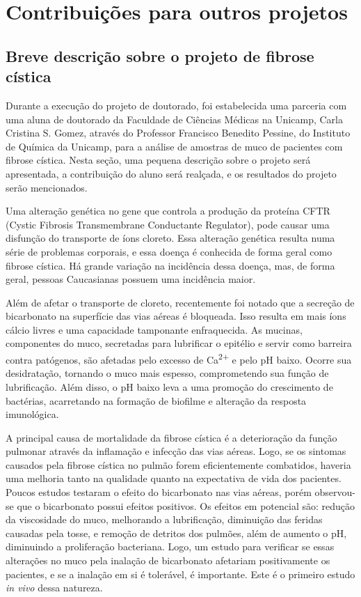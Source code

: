 \part{Contribuições para outros projetos}

	\chapter{Breve descrição sobre o projeto de fibrose cística}

	Durante a execução do projeto de doutorado, foi estabelecida uma parceria com uma aluna de doutorado da Faculdade de Ciências Médicas na Unicamp, Carla Cristina S. Gomez, através do Professor Francisco Benedito Pessine, do Instituto de Química da Unicamp, para a análise de amostras de muco de pacientes com fibrose cística. Nesta seção, uma pequena descrição sobre o projeto será apresentada, a contribuição do aluno será realçada, e os resultados do projeto serão mencionados.
	
	Uma alteração genética no gene que controla a produção da proteína CFTR (Cystic Fibrosis Transmembrane Conductante Regulator)\cite{Zielenski2000}, pode causar uma disfunção do transporte de íons cloreto.\cite{Quinton2008} Essa alteração genética resulta numa série de problemas corporais, e essa doença é conhecida de forma geral como fibrose cística. Há grande variação na incidência dessa doença, mas, de forma geral, pessoas Caucasianas possuem uma incidência maior.\cite{Zielenski2000}
	
	Além de afetar o transporte de cloreto, recentemente foi notado que a secreção de bicarbonato na superfície das vias aéreas é bloqueada.\cite{Quinton2001}  Isso resulta em mais íons cálcio livres e uma capacidade tamponante enfraquecida. As mucinas, componentes do muco, secretadas para lubrificar o epitélio e servir como barreira contra patógenos, são afetadas pelo excesso de Ca\textsuperscript{2+} e pelo pH baixo. Ocorre sua desidratação, tornando o muco mais espesso, comprometendo sua função de lubrificação.\cite{Quinton2008} Além disso, o pH baixo leva a uma promoção do crescimento de bactérias, acarretando na formação de biofilme e alteração da resposta imunológica.\cite{Dorschner2006}
	
	A principal causa de mortalidade da fibrose cística é a deterioração da função pulmonar através da inflamação e infecção das vias aéreas.\cite{Quinton2001} Logo, se os sintomas causados pela fibrose cística no pulmão forem eficientemente combatidos, haveria uma melhoria tanto na qualidade quanto na expectativa de vida dos pacientes. Poucos estudos testaram o efeito do bicarbonato nas vias aéreas, porém observou-se que o bicarbonato possui efeitos positivos.\cite{Stigliani2016} Os efeitos em potencial são: redução da viscosidade do muco, melhorando a lubrificação, diminuição das feridas causadas pela tosse, e remoção de detritos dos pulmões, além de aumento o pH, diminuindo a proliferação bacteriana. Logo, um estudo para verificar se essas alterações no muco pela inalação de bicarbonato afetariam positivamente os pacientes, e se a inalação em si é tolerável, é importante. Este é o primeiro estudo \emph{in vivo} dessa natureza.
	
